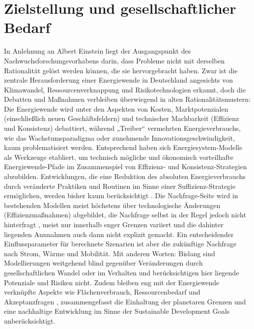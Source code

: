 \documentclass[a4paper,11pt,twoside]{scrartcl}
\begin{document}
\onehalfspacing

\clearpage


{\singlespacing

}

\setcounter{page}{1}

\section{Zielstellung und gesellschaftlicher Bedarf}
\label{sec:ziel}

In Anlehnung an Albert Einstein liegt der Ausgangspunkt des Nachwuchsforschungsvorhabens darin, dass Probleme nicht mit derselben Rationalität gelöst werden können, die sie hervorgebracht haben. Zwar ist die zentrale Herausforderung einer Energiewende in Deutschland angesichts von Klimawandel, Ressourcenverknappung und Risikotechnologien erkannt, doch die Debatten und Maßnahmen verbleiben überwiegend in alten Rationalitätsmustern: Die Energiewende wird unter den Aspekten von Kosten, Marktpotenzialen (einschließlich neuen Geschäftsfeldern) und technischer Machbarkeit (Effizienz und Konsistenz) debattiert, während „Treiber“ vermehrten Energieverbrauchs, wie das Wachstumsparadigma oder zunehmende Innovationsgeschwindigkeit, kaum problematisiert werden. Entsprechend haben sich Energiesystem-Modelle als Werkzeuge etabliert, um technisch mögliche und ökonomisch vorteilhafte Energiewende-Pfade im Zusammenspiel von Effizienz- und Konsistenz-Strategien abzubilden. Entwicklungen, die eine Reduktion des absoluten Energieverbrauchs durch veränderte Praktiken und Routinen im Sinne einer Suffizienz-Strategie ermöglichen, werden bisher kaum berücksichtigt \cite{SAMADI2017}. Die Nachfrage-Seite wird in bestehenden Modellen meist höchstens über technologische Änderungen (Effizienzmaßnahmen) abgebildet, die Nachfrage selbst in der Regel jedoch nicht hinterfragt \cite{Creutzig2018}, meist nur innerhalb enger Grenzen variiert und die dahinter liegenden Annnahmen auch dann nicht explizit gemacht. Ein entscheidender Einflussparameter für berechnete Szenarien ist aber die zukünftige Nachfrage nach Strom, Wärme und Mobilität. Mit anderen Worten: Bislang sind Modellierungen weitgehend blind gegenüber Veränderungen durch gesellschaftlichen Wandel oder im Verhalten und berücksichtigen hier liegende Potenziale und Risiken nicht. Zudem bleiben eng mit der Energiewende verknüpfte Aspekte wie Flächenverbrauch, Ressourcenbedarf \cite{Mocker2015,Buchert2011} und Akzeptanzfragen \cite{Fuchs2016}, zusammengefasst die Einhaltung der planetaren Grenzen \cite{Rockstroem2009} und eine nachhaltige Entwicklung im Sinne der Sustainable Development Goals \cite{UN_SDG} unberücksichtigt. 
\end{document}
